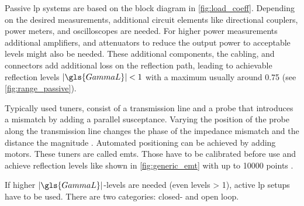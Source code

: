 \documentclass[12pt,a4paper,parskip=full,abstract=true,BCOR=12mm,twoside,open=right]{scrreprt}
\providecommand{\abs}[1]{\lvert#1\rvert}
\begin{document}
Passive \gls{lp} systems are based on the block diagram in \cref{fig:load_coeff}. Depending on
the desired measurements, additional circuit elements like directional couplers,
power meters, and oscilloscopes are needed. For higher power measurements additional
amplifiers, and attenuators to reduce the output power to acceptable levels might also
be needed. These additional components, the cabling, and connectors add additional loss
on the reflection path, leading to achievable reflection levels $\abs{\gls{GammaL}} < 1$ with
a maximum usually around 0.75 \cite{de_groote_introduction_2008} (see \cref{fig:range_passive}).

Typically used tuners, consist of a transmission line and a probe that introduces a mismatch
by adding a parallel susceptance. Varying the position of the probe along the transmission
line changes the phase of the impedance mismatch and the distance the magnitude \cite{hashmi_highly_2011}.
Automated positioning can be achieved by adding motors. These tuners are called \glspl{emt}.
Those have to be calibrated before use and achieve reflection levels like shown in
\cref{fig:generic_emt} with up to 10000 points \cite{ghannouchi_load-pull_2013}.

If higher $\abs{\gls{GammaL}}$-levels  are needed (even levels \num{> 1}), active \gls{lp} setups
have to be used. There are two categories: closed- and open loop.
\end{document}
